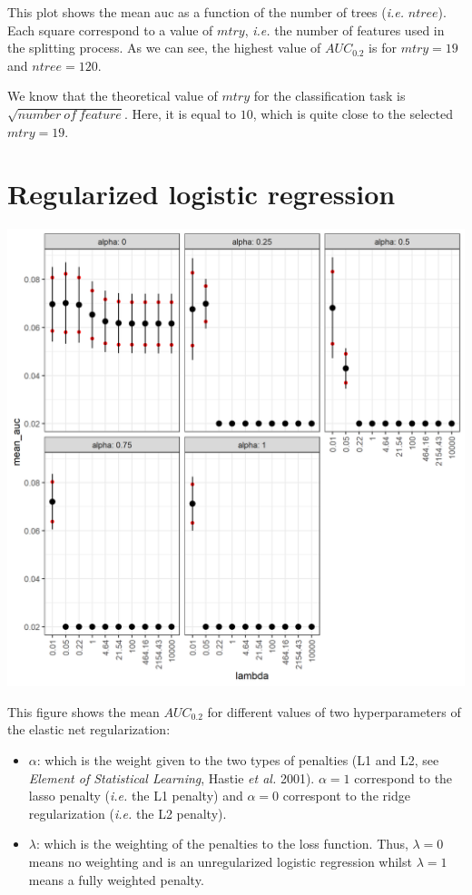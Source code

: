 \documentclass[
  12pt,
  oneside]{report}
\begin{document}
This plot shows the mean auc as a function of the number of trees (\emph{i.e.} \(ntree\)). Each square correspond to a value of \(mtry\), \emph{i.e.} the number of features used in the splitting process. As we can see, the highest value of \(AUC_{0.2}\) is for \(mtry = 19\) and \(ntree = 120\).

We know that the theoretical value of \(mtry\) for the classification task is \(\sqrt{number\:of\:feature}\). Here, it is equal to \(10\), which is quite close to the selected \(mtry = 19\).

\hypertarget{regularized-logistic-regression}{%
\section{Regularized logistic regression}\label{regularized-logistic-regression}}

\includegraphics[width=29.17in]{data/cv_lr}

This figure shows the mean \(AUC_{0.2}\) for different values of two hyperparameters of the elastic net regularization:

\begin{itemize}
\item
  \(\alpha\): which is the weight given to the two types of penalties (L1 and L2, see \emph{Element of Statistical Learning}, Hastie \emph{et al.} 2001). \(\alpha = 1\) correspond to the lasso penalty (\emph{i.e.} the L1 penalty) and \(\alpha = 0\) correspont to the ridge regularization (\emph{i.e.} the L2 penalty).
\item
  \(\lambda\): which is the weighting of the penalties to the loss function. Thus, \(\lambda = 0\) means no weighting and is an unregularized logistic regression whilst \(\lambda = 1\) means a fully weighted penalty.
\end{itemize}
\end{document}
